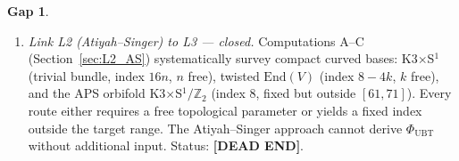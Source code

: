 \documentclass[11pt,a4paper]{article}
\theoremstyle{definition}
\newtheorem{gap}{Gap}
\theoremstyle{remark}
\begin{document}
\begin{gap}
\begin{enumerate}
          (equation~\eqref{eq:phi_required}).
          A resolution requires either a net fermionic spectral contribution
          ($b_{\mathrm{eff}} < 0$), a modified spectral cutoff, or a
          reconciliation of the L1 and L3 identifications of
          $\Phi_{\mathrm{UBT}}$.
    \item \emph{Link L2 (Atiyah--Singer) to L3 --- closed.}
          Computations A--C (Section~\ref{sec:L2_AS}) systematically
          survey compact curved bases: K3$\times$S$^1$ (trivial bundle,
          index $16n$, $n$ free), twisted $\mathrm{End}(V)$ (index $8-4k$,
          $k$ free), and the APS orbifold K3$\times$S$^1/\mathbb{Z}_2$
          (index $8$, fixed but outside $[61,71]$).
          Every route either requires a free topological parameter or yields
          a fixed index outside the target range.
          The Atiyah--Singer approach cannot derive $\Phi_{\mathrm{UBT}}$
          without additional input.
          Status: \textbf{[DEAD END]}.
  \end{enumerate}
\end{gap}

\ifdefined\INCLUDEMODE\else
\end{document}
